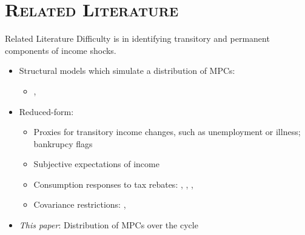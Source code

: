 \documentclass{beamer}
\begin{document}
\section{\scshape Related Literature}
\begin{frame}{Related Literature}
Difficulty is in identifying transitory and permanent components of income shocks.
		\begin{itemize}
		\item Structural models which simulate a distribution of MPCs: 
		\begin{itemize}
		\item \citet{CSTW2017}, \cite{Carroll2014}
		\end{itemize}
		\item Reduced-form:
			\begin{itemize}
				\item Proxies for transitory income changes, such as unemployment or illness; bankrupcy flags \cite{Gross2020}
				\item Subjective expectations of income \cite{Pistaferri2001}
				\item Consumption responses to tax rebates:  \citet{KaplanViolanteWeidner2014}, \citet{ParkerEtAl2013}, \citet{JohnsonParkerSouleles2004}, \citet{MisraSurico2014} \citet{Lewis2019}
				\item Covariance restrictions: \citet{BPP}, \citet{KaplanViolante2014}
				
			\end{itemize}
		\item \textit{This paper}: Distribution of MPCs over the cycle
		\end{itemize}

\end{frame}
\end{document}
